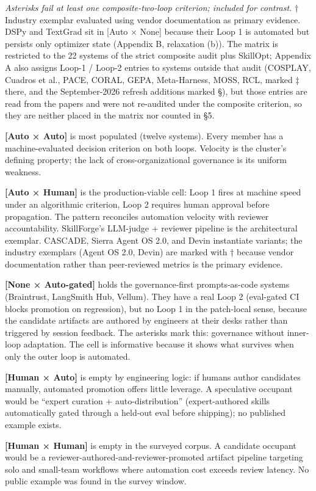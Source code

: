 \documentclass[
]{article}
\begin{document}
\emph{Asterisks fail at least one composite-two-loop criterion; included
for contrast.} † Industry exemplar evaluated using vendor documentation
as primary evidence. DSPy and TextGrad sit in {[}Auto × None{]} because
their Loop 1 is automated but persists only optimizer state (Appendix B,
relaxation (b)). The matrix is restricted to the 22 systems of the
strict composite audit plus SkillOpt; Appendix A also assigns Loop-1 /
Loop-2 entries to systems outside that audit (COSPLAY, Cuadros et al.,
PACE, CORAL, GEPA, Meta-Harness, MOSS, RCL, marked ‡ there, and the
September-2026 refresh additions marked §), but those entries are read
from the papers and were not re-audited under the composite criterion,
so they are neither placed in the matrix nor counted in §5.

\textbf{{[}Auto × Auto{]}} is most populated (twelve systems). Every
member has a machine-evaluated decision criterion on both loops.
Velocity is the cluster's defining property; the lack of
cross-organizational governance is its uniform weakness.

\textbf{{[}Auto × Human{]}} is the production-viable cell: Loop 1 fires
at machine speed under an algorithmic criterion, Loop 2 requires human
approval before propagation. The pattern reconciles automation velocity
with reviewer accountability. SkillForge's LLM-judge + reviewer pipeline
is the architectural exemplar. CASCADE, Sierra Agent OS 2.0, and Devin
instantiate variants; the industry exemplars (Agent OS 2.0, Devin) are
marked with † because vendor documentation rather than peer-reviewed
metrics is the primary evidence.

\textbf{{[}None × Auto-gated{]}} holds the governance-first
prompts-as-code systems (Braintrust, LangSmith Hub, Vellum). They have a
real Loop 2 (eval-gated CI blocks promotion on regression), but no Loop
1 in the patch-local sense, because the candidate artifacts are authored
by engineers at their desks rather than triggered by session feedback.
The asterisks mark this: governance without inner-loop adaptation. The
cell is informative because it shows what survives when only the outer
loop is automated.

\textbf{{[}Human × Auto{]}} is empty by engineering logic: if humans
author candidates manually, automated promotion offers little leverage.
A speculative occupant would be ``expert curation + auto-distribution''
(expert-authored skills automatically gated through a held-out eval
before shipping); no published example exists.

\textbf{{[}Human × Human{]}} is empty in the surveyed corpus. A
candidate occupant would be a reviewer-authored-and-reviewer-promoted
artifact pipeline targeting solo and small-team workflows where
automation cost exceeds review latency. No public example was found in
the survey window.
\end{document}
